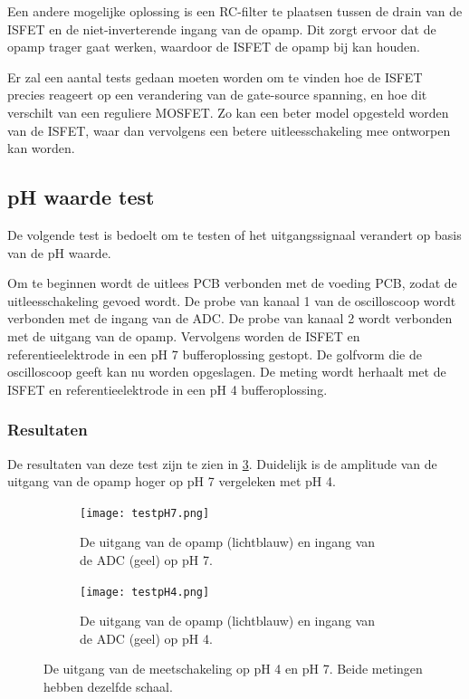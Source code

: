 Een andere mogelijke oplossing is een RC-filter te plaatsen tussen de drain van de ISFET en de niet-inverterende ingang van de opamp. Dit zorgt ervoor dat de opamp trager gaat werken, waardoor de ISFET de opamp bij kan houden.

Er zal een aantal tests gedaan moeten worden om te vinden hoe de ISFET precies reageert op een verandering van de gate-source spanning, en hoe dit verschilt van een reguliere MOSFET. Zo kan een beter model opgesteld worden van de ISFET, waar dan vervolgens een betere uitleesschakeling mee ontworpen kan worden.


\subsection{pH waarde test} 
De volgende test is bedoelt om te testen of het uitgangssignaal verandert op basis van de pH waarde. 

Om te beginnen wordt de uitlees PCB verbonden met de voeding PCB, zodat de uitleesschakeling gevoed wordt. De probe van kanaal 1 van de oscilloscoop wordt verbonden met de ingang van de ADC. De probe van kanaal 2 wordt verbonden met de uitgang van de opamp. Vervolgens worden de ISFET en referentieelektrode in een pH 7 bufferoplossing gestopt. De golfvorm die de oscilloscoop geeft kan nu worden opgeslagen. De meting wordt herhaalt met de ISFET en referentieelektrode in een pH 4 bufferoplossing.

\subsubsection{Resultaten}
De resultaten van deze test zijn te zien in \cref{fig:resultspHMeasure}. Duidelijk is de amplitude van de uitgang van de opamp hoger op pH 7 vergeleken met pH 4.

\begin{figure}[ht]
    \centering
    \begin{subfigure}[b]{0.475\textwidth}
        \centering
        \def\svgwidth{\textwidth}
        \texttt{[image: testpH7.png]}
        \caption{De uitgang van de opamp (lichtblauw) en ingang van de ADC (geel) op pH 7.}
        \label{fig:resultpH7}
    \end{subfigure}
    \hfill
    \begin{subfigure}[b]{0.475\textwidth}
        \centering
        \def\svgwidth{\textwidth}
        \texttt{[image: testpH4.png]}
        \caption{De uitgang van de opamp (lichtblauw) en ingang van de ADC (geel) op pH 4.}
        \label{fig:resultpH4}
    \end{subfigure}
    \caption{De uitgang van de meetschakeling op pH 4 en pH 7. Beide metingen hebben dezelfde schaal.}
    \label{fig:resultspHMeasure}
\end{figure}

